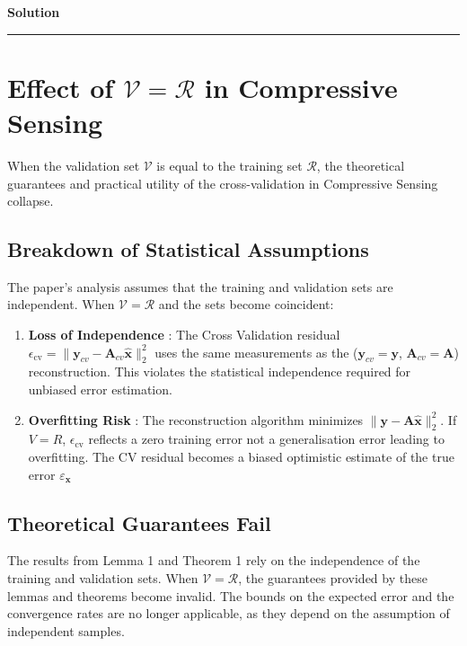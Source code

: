 \documentclass[a4paper,12pt]{article}
\newenvironment{solution}[2][]{%
    \begin{mdframed}[linecolor=blue!70!black, linewidth=2pt, roundcorner=10pt, backgroundcolor=yellow!10!white, skipabove=12pt, skipbelow=12pt]%
        \textbf{\large #2}
        \par\noindent\rule{\textwidth}{0.4pt}
}{
    \end{mdframed}
}
\begin{document}
\begin{solution}{Solution}
  \section{Effect of $\mathcal{V} = \mathcal{R}$ in Compressive Sensing}

  When the validation set $\mathcal{V}$ is equal to the training set $\mathcal{R}$, the theoretical guarantees and practical utility of the cross-validation in Compressive Sensing collapse.

  \subsection{Breakdown of Statistical Assumptions}

  The paper's analysis assumes that the training and validation sets are independent. When $\mathcal{V} = \mathcal{R}$ and the sets become coincident:

  \begin{enumerate}
    \item \textbf{Loss of Independence} : The Cross Validation residual $\epsilon_{\text{cv}} = \| \mathbf{y}_{cv} - \mathbf{A}_{cv} \hat{\mathbf{x}} \|_2^2$ uses the same measurements as the  ($\mathbf{y}_{cv} = \mathbf{y}$, $\mathbf{A}_{cv} = \mathbf{A}$) reconstruction. This violates the statistical independence required for unbiased error estimation.
    \item \textbf{Overfitting Risk} : The reconstruction algorithm minimizes $\| \mathbf{y} - \mathbf{A} \hat{\mathbf{x}} \|_2^2$. If $ V = R $, $\epsilon_{\text{cv}}$ reflects a zero training error not a generalisation error leading to overfitting. The CV residual becomes a biased optimistic estimate of the true error $\varepsilon_{\mathbf{x}}$
  \end{enumerate}

  \subsection{Theoretical Guarantees Fail}

  The results from Lemma 1 and Theorem 1 rely on the independence of the training and validation sets. When $\mathcal{V} = \mathcal{R}$, the guarantees provided by these lemmas and theorems become invalid. The bounds on the expected error and the convergence rates are no longer applicable, as they depend on the assumption of independent samples.


\end{solution}
\end{document}
